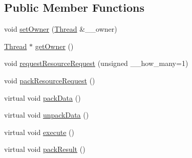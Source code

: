 \subsection*{Public Member Functions}
\begin{CompactItemize}
\item 
\hypertarget{classService_33b149b98498c0e7e401b0f0839d7f0d}{
void \hyperlink{classService_33b149b98498c0e7e401b0f0839d7f0d}{set\-Owner} (\hyperlink{classThread}{Thread} \&\_\-\_\-owner)}
\label{classService_33b149b98498c0e7e401b0f0839d7f0d}

\item 
\hypertarget{classService_0dae00309c51a7b7069788142aed799f}{
\hyperlink{classThread}{Thread} $\ast$ \hyperlink{classService_0dae00309c51a7b7069788142aed799f}{get\-Owner} ()}
\label{classService_0dae00309c51a7b7069788142aed799f}

\item 
\hypertarget{classService_7e2ae35a9070a05dcd46488df649896d}{
void \hyperlink{classService_7e2ae35a9070a05dcd46488df649896d}{request\-Resource\-Request} (unsigned \_\-\_\-how\_\-many=1)}
\label{classService_7e2ae35a9070a05dcd46488df649896d}

\item 
\hypertarget{classService_c4289f98d1cd9ed53e850efbb6a947bd}{
void \hyperlink{classService_c4289f98d1cd9ed53e850efbb6a947bd}{pack\-Resource\-Request} ()}
\label{classService_c4289f98d1cd9ed53e850efbb6a947bd}

\item 
\hypertarget{classService_aea4b8f7f8fb88e83862ee4bfd9ab207}{
virtual void \hyperlink{classService_aea4b8f7f8fb88e83862ee4bfd9ab207}{pack\-Data} ()}
\label{classService_aea4b8f7f8fb88e83862ee4bfd9ab207}

\item 
\hypertarget{classService_3bd87b444710813d30fd754d4d0b4df3}{
virtual void \hyperlink{classService_3bd87b444710813d30fd754d4d0b4df3}{unpack\-Data} ()}
\label{classService_3bd87b444710813d30fd754d4d0b4df3}

\item 
\hypertarget{classService_e4f2894e6121e60f38d41cfbd7447ae4}{
virtual void \hyperlink{classService_e4f2894e6121e60f38d41cfbd7447ae4}{execute} ()}
\label{classService_e4f2894e6121e60f38d41cfbd7447ae4}

\item 
\hypertarget{classService_e5e4f90b2315e15c2a2913bd370f4cf5}{
virtual void \hyperlink{classService_e5e4f90b2315e15c2a2913bd370f4cf5}{pack\-Result} ()}
\label{classService_e5e4f90b2315e15c2a2913bd370f4cf5}


\end{CompactItemize}
